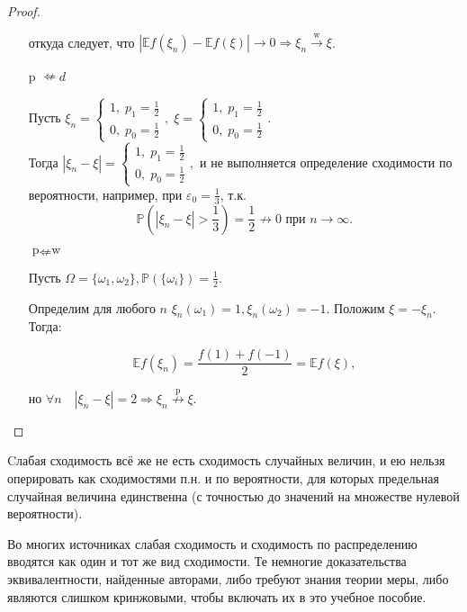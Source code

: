 \begin{proof}
\begin{itemize}
    откуда следует, что $|\mathbb{E}f(\xi_n) - \mathbb{E}f(\xi)| \rightarrow 0 \Rightarrow \xi_n \xrightarrow[]{\text{w}} \xi$.
    
    \item[p $\nLeftarrow d$]
    
    Пусть $\xi_n = \begin{cases}
    1, \; p_1 = \frac{1}{2} \\
    0, \; p_0 = \frac{1}{2}
    \end{cases}, \; 
    \xi = \begin{cases}
    1, \; p_1 = \frac{1}{2} \\
    0, \; p_0 = \frac{1}{2}
    \end{cases}.$ \\
    Тогда $|\xi_n - \xi| = \begin{cases}
    1, \; p_1 = \frac{1}{2} \\
    0, \; p_0 = \frac{1}{2}
    \end{cases},$ \; и не выполняется определение сходимости по вероятности, например, при $\varepsilon_0 = \frac{1}{3}$, т.к. 
    $$ \mathbb{P}\left({|\xi_n - \xi| > \frac{1}{3}}\right) = \frac{1}{2} {\nrightarrow} 0 \text{ при } n \to \infty.
    $$
    
   \item[$\text{p} \nLeftarrow \text{w}$]
    
    Пусть $\Omega = \{\omega_1, \omega_2 \}, \mathbb{P}(\{\omega_i \}) = \frac{1}{2}.$ 
    
    Определим для любого $n$ $\xi_n(\omega_1) = 1, \xi_n(\omega_2) = -1.$ Положим $\xi = -\xi_n.$ Тогда:
    
    $$ \mathbb{E}f(\xi_n) = \frac{f(1) + f(-1)}{2} = \mathbb{E}f(\xi),$$
    
    но $\forall n \quad |\xi_n - \xi| = 2 \Rightarrow \xi_n \overset{\text{p}}{\nrightarrow} \xi.$
    
\end{itemize}    
\end{proof}

\begin{rmrk}
    Cлабая сходимость всё же не есть сходимость случайных величин, и ею нельзя оперировать как сходимостями п.н. и по вероятности, для которых предельная случайная величина единственна (с точностью до значений на множестве нулевой вероятности).
\end{rmrk}

\begin{rmrk}
    Во многих источниках слабая сходимость и сходимость по распределению вводятся как один и тот же вид сходимости. Те немногие доказательства эквивалентности, найденные авторами, либо требуют знания теории меры, либо являются слишком кринжовыми, чтобы включать их в это учебное пособие.
\end{rmrk}


